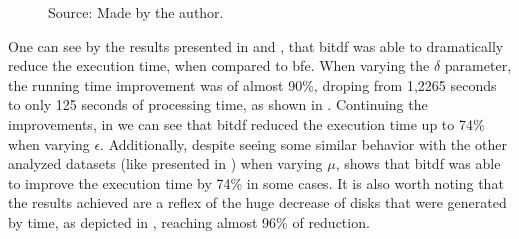 {\begin{figure}[h!]
\begin{subfigure}[t]{0.48\textwidth}
        \label{fig:tdrive_vary_g}
    \end{subfigure}
    \footnotesize{Source: Made by the author.}
    \label{fig:tdrive_results}
\end{figure}

One can see by the results presented in  and , that \ac{bitdf}
was able to dramatically reduce the execution time, when compared to \ac{bfe}. When varying the $\delta$ parameter, the
running time improvement was of almost 90\%, droping from 1,2265 seconds to only 125 seconds of processing time, as
shown in . Continuing the improvements, in  we can see that
\ac{bitdf} reduced the execution time up to 74\% when varying $\epsilon$. Additionally, despite seeing some similar
behavior with the other analyzed datasets (like presented in ) when varying $\mu$,
 shows that \ac{bitdf} was able to improve the execution time by 74\% in some cases. It is
also worth noting that the results achieved are a reflex of the huge decrease of disks that were generated by time, as
depicted in , reaching almost 96\% of reduction.

}

